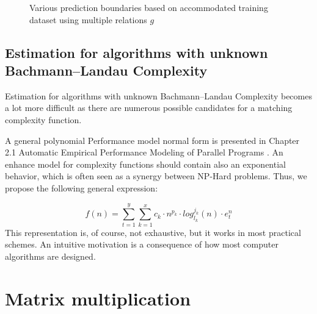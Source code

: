 \begin{figure}[H]
\caption{Various prediction boundaries based on accommodated training dataset  using multiple relations $g$}
\end{figure}


\subsection{Estimation for algorithms with unknown Bachmann–Landau Complexity}
Estimation for algorithms with unknown Bachmann–Landau Complexity becomes a lot more difficult as there are numerous possible candidates for a matching complexity function. 

A general polynomial Performance model normal form is presented in Chapter 2.1 Automatic Empirical Performance Modeling of Parallel Programs \cite{calotoiu2018automatic}. An enhance model for complexity functions should contain also an exponential behavior, which is often seen as a synergy between NP-Hard problems. Thus, we propose the following general expression:

\[ f(n) =\sum\limits_{t=1}^{y}  \sum\limits_{k=1}^{x} c_{k} \cdot n^{p_{k}} \cdot log_{l_{k}}^{j_{k}}(n) \cdot e_{t}^{n} \]
This representation is, of course, not exhaustive, but it works in most practical schemes. An intuitive motivation is a consequence of how most computer algorithms are designed. \cite{calotoiu2018automatic}



\section{Matrix multiplication}